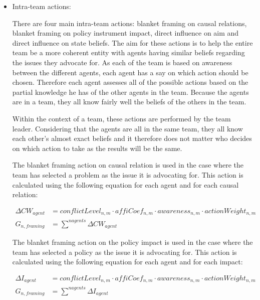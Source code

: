 \begin{itemize}


\item Intra-team actions:


There are four main intra-team actions: blanket framing on causal relations, blanket framing on policy instrument impact, direct influence on aim and direct influence on state beliefs. The aim for these actions is to help the entire team be a more coherent entity with agents having similar beliefs regarding the issues they advocate for. As each of the team is based on awareness between the different agents, each agent has a say on which action should be chosen. Therefore each agent assesses all of the possible actions based on the partial knowledge he has of the other agents in the team. Because the agents are in a team, they all know fairly well the beliefs of the others in the team.


Within the context of a team, these actions are performed by the team leader. Considering that the agents are all in the same team, they all know each other's almost exact beliefs and it therefore does not matter who decides on which action to take as the results will be the same.


The blanket framing action on causal relation is used in the case where the team has selected a problem as the issue it is advocating for. This action is calculated using the following equation for each agent and for each causal relation:


\begin{equation} \begin{split}
 \Delta CW_{agent} &=  conflictLevel_{n,m} \cdot affiCoef_{n,m} \cdot awareness_{n,m} \cdot actionWeight_{n,m} \\
 G_{n,framing} &= \sum^{nagents}  \Delta CW_{agent}
\end{split}\end{equation}


The blanket framing action on the policy impact is  used in the case where the team has selected a policy as the issue it is advocating for. This action is calculated using the following equation for each agent and for each impact:


\begin{equation} \begin{split}
 \Delta I_{agent} &=  conflictLevel_{n,m} \cdot affiCoef_{n,m} \cdot awareness_{n,m} \cdot actionWeight_{n,m} \\
 G_{n,framing} &= \sum^{nagents}  \Delta I_{agent}
\end{split}\end{equation}



\end{itemize}
